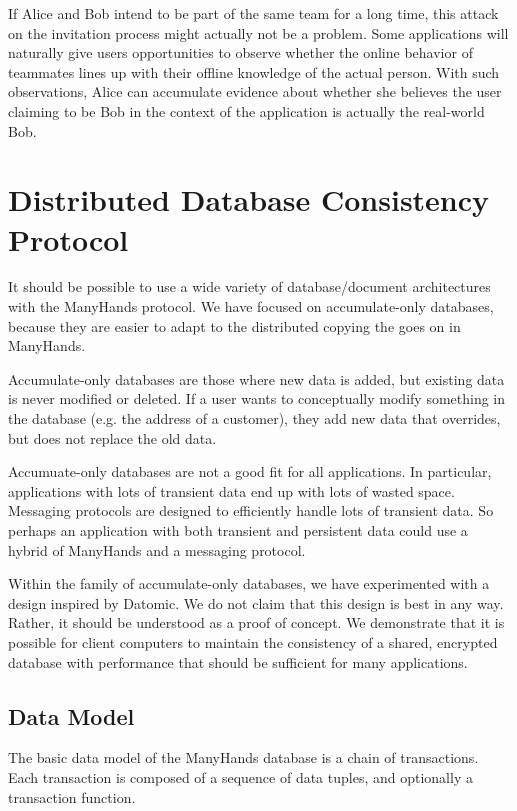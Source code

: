 \documentclass[pldi,10pt,preprint]{sigplanconf-pldi16}
\begin{document}
If Alice and Bob intend to be part of the same team for a long time, this attack on the invitation process might actually not be a problem.
Some applications will naturally give users opportunities to observe whether the online behavior of teammates lines up with their offline knowledge of the actual person.
With such observations, Alice can accumulate evidence about whether she believes the user claiming to be Bob in the context of the application is actually the real-world Bob.

\section{Distributed Database Consistency Protocol}

It should be possible to use a wide variety of database/document architectures with the ManyHands protocol.
We have focused on accumulate-only databases, because they are easier to adapt to the distributed copying the goes on in ManyHands.

Accumulate-only databases are those where new data is added, but existing data is never modified or deleted.
If a user wants to conceptually modify something in the database (e.g. the address of a customer), they add new data that overrides, but does not replace the old data.

Accumuate-only databases are not a good fit for all applications.
In particular, applications with lots of transient data end up with lots of wasted space.
Messaging protocols are designed to efficiently handle lots of transient data.
So perhaps an application with both transient and persistent data could use a hybrid of ManyHands and a messaging protocol.

Within the family of accumulate-only databases, we have experimented with a design inspired by Datomic.
We do not claim that this design is best in any way.
Rather, it should be understood as a proof of concept.
We demonstrate that it is possible for client computers to maintain the consistency of a shared, encrypted database with performance that should be sufficient for many applications.

\subsection{Data Model}

The basic data model of the ManyHands database is a chain of transactions.
Each transaction is composed of a sequence of data tuples, and optionally a transaction function.
\end{document}
